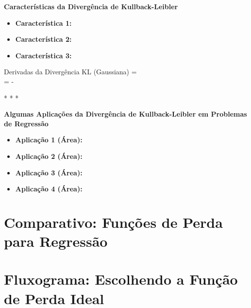 \textbf{Características da Divergência de Kullback-Leibler}
\vspace{1em}

\begin{itemize}
    \item \textbf{Característica 1:}
    \item \textbf{Característica 2:}
    \item \textbf{Característica 3:}
\end{itemize}

\begin{equacaodestaque}{Derivadas da Divergência KL (Gaussiana)}
     = 
    \\[10pt] %
     =  - 
    \label{eq:kl-divergence-derivada-gaussiana}
\end{equacaodestaque}

\medskip
\begin{center}
 * * *
\end{center}
\medskip

\textbf{Algumas Aplicações da Divergência de Kullback-Leibler em Problemas de Regressão}
\vspace{1em}

\begin{itemize}
    \item \textbf{Aplicação 1 (Área):}
    \item \textbf{Aplicação 2 (Área):}
    \item \textbf{Aplicação 3 (Área):}
    \item \textbf{Aplicação 4 (Área):}
\end{itemize}

\section{Comparativo: Funções de Perda para Regressão}

\section{Fluxograma: Escolhendo a Função de Perda Ideal}
